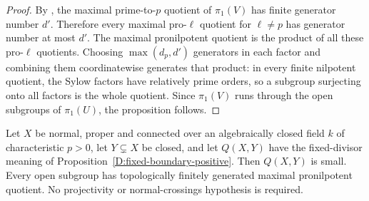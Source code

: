 \begin{proof}
By \cite[Theorem 4.11]{Orgogozo2003}, the maximal prime-to-$p$
quotient of $\pi_1(V)$ has finite generator number $d'$.
Therefore every maximal pro-$\ell$ quotient for $\ell\ne p$
has generator number at most $d'$. The maximal pronilpotent
quotient is the product of all these pro-$\ell$ quotients.
Choosing $\max(d_p,d')$ generators in each factor and combining
them coordinatewise generates that product: in every finite
nilpotent quotient, the Sylow factors have relatively prime
orders, so a subgroup surjecting onto all factors is the whole
quotient. Since $\pi_1(V)$ runs through the open subgroups
of $\pi_1(U)$, the proposition follows.
\end{proof}

\begin{proposition}
\label{D:fixed-boundary-small}
Let $X$ be normal, proper and connected over an algebraically
closed field $k$ of characteristic $p>0$, let $Y\subsetneq X$
be closed, and let $Q(X,Y)$ have the fixed-divisor meaning of
Proposition~\ref{D:fixed-boundary-positive}. Then $Q(X,Y)$
is small. Every open subgroup has topologically finitely
generated maximal pronilpotent quotient. No projectivity or
normal-crossings hypothesis is required.
\end{proposition}
